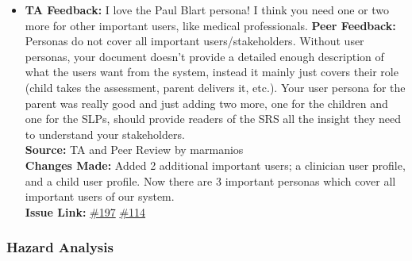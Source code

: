 \documentclass{article}
\begin{document}
\begin{itemize}
  \item
    \textbf{TA Feedback:} I love the Paul Blart persona! I think you need one or two more for other important users, like medical professionals.
    \textbf{Peer Feedback:} Personas do not cover all important users/stakeholders. Without user personas, your document doesn't provide a detailed enough description of what the users want from the system, instead it mainly just covers their role (child takes the assessment, parent delivers it, etc.). Your user persona for the parent was really good and just adding two more, one for the children and one for the SLPs, should provide readers of the SRS all the insight they need to understand your stakeholders. \\
    \textbf{Source:} TA and Peer Review by marmanios\\
    \textbf{Changes Made:} Added 2 additional important users; a clinician user profile, and a child user profile. Now there are 3 important personas which cover all important users of our system.\\
    \textbf{Issue Link:} \href{https://github.com/parishanizam/TeleHealth/issues/197}{\#197} \href{https://github.com/parishanizam/TeleHealth/issues/114}{\#114}

  \end{itemize}

\newpage

\subsubsection{Hazard Analysis}
\end{document}
